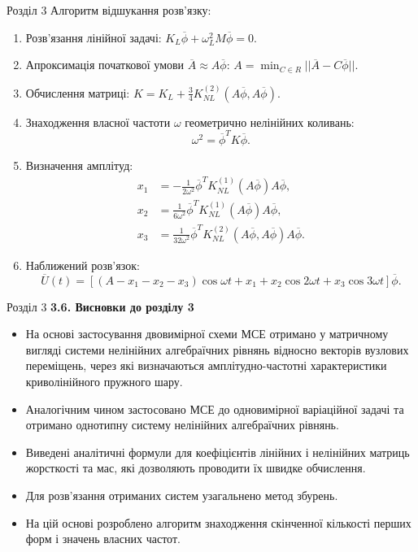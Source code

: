 \documentclass[8pt]{beamer}
\numberwithin{figure}{section}
\numberwithin{equation}{section}
\numberwithin{table}{section}
\begin{document}
\begin{frame}{Розділ 3}
Алгоритм відшукання розв'язку:
\begin{enumerate}
	\item Розв’язання лінійної задачі:
	$K_L\overline{\phi}+\omega_L^2 M \overline{\phi}=0$.
 
	\item Апроксимація початкової умови $\overline{A}\approx A\overline{\phi}$: 
	$\displaystyle A=\min_{C \in R} ||\overline{A}-C\overline{\phi}||$.
	\item Обчислення матриці:
	$K = K_L + \frac34 K_{NL}^{(2)}\left( A\overline{\phi},A\overline{\phi} \right) $.
	\item Знаходження власної частоти $\omega$ геометрично нелінійних коливань:
	\[\omega^2=\overline{\phi}^T K \overline{\phi}.\]
	\item Визначення амплітуд:
 \begin{align*}
x_1&=-\frac{1}{2\omega ^2}\overline{\phi}^T K_{NL}^{(1)}\left( A\overline{\phi} \right) A\overline{\phi},\\
x_2&=\frac{1}{6\omega ^2}\overline{\phi}^T K_{NL}^{(1)}\left( A\overline{\phi} \right) A\overline{\phi},\\
x_3&=\frac{1}{32\omega ^2}\overline{\phi}^T K_{NL}^{(2)}\left( A\overline{\phi},A\overline{\phi} \right) A\overline{\phi}.
\end{align*}
	\item Наближений розв'язок:
	\[
	\overline{U}\left(t\right)=\left[\left(A-x_1-x_2-x_3\right)\cos \omega t + x_1+x_2\cos 2 \omega t+x_3\cos 3 \omega t\right]\overline{\phi}.
	\]
\end{enumerate}
\end{frame}

\begin{frame}{Розділ 3}
\textbf{3.6. Висновки до розділу 3}
\\
\vspace{1em}
\begin{itemize}
\item На основі застосування двовимірної схеми МСЕ отримано у матричному вигляді системи нелінійних алгебраїчних рівнянь відносно векторів вузлових переміщень, через які визначаються амплітудно-частотні характеристики криволінійного пружного шару.
\item Аналогічним чином застосовано МСЕ до одновимірної варіаційної задачі та отримано однотипну систему нелінійних алгебраїчних рівнянь.
\item Виведені аналітичні формули для коефіцієнтів лінійних і нелінійних матриць жорсткості та мас, які дозволяють проводити їх швидке обчислення.
\item Для розв'язання отриманих систем узагальнено метод збурень.
\item На цій основі розроблено алгоритм знаходження скінченної кількості перших форм і значень власних частот. 
\end{itemize}

\end{frame}
\end{document}
